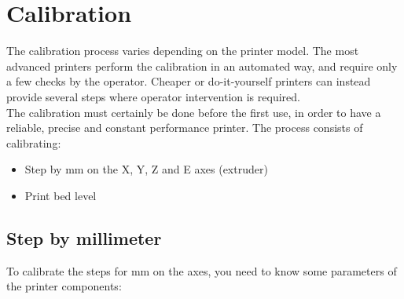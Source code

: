 \section{Calibration}
The calibration process varies depending on the printer model. The most advanced printers perform the calibration in an automated way, and require only a few checks by the operator. Cheaper or do-it-yourself printers can instead provide several steps where operator intervention is required. \\
The calibration must certainly be done before the first use, in order to have a reliable, precise and constant performance printer. The \parencite{Reference4} process consists of calibrating:

\begin{itemize}
\item Step by mm on the X, Y, Z and E axes (extruder)
\item Print bed level
\end{itemize}

\subsection{Step by millimeter}
To calibrate the steps for mm on the axes, you need to know some parameters of the printer components:

